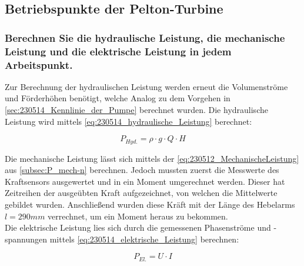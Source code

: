 \subsection{Betriebspunkte der Pelton-Turbine}
\subsubsection{Berechnen Sie die hydraulische Leistung, die mechanische Leistung und die elektrische Leistung in jedem Arbeitspunkt.}
Zur Berechnung der hydraulischen Leistung werden erneut die Volumenströme und Förderhöhen benötigt, welche Analog zu dem Vorgehen in \autoref{sec:230514_Kennlinie_der_Pumpe} berechnet wurden.
Die hydraulische Leistung wird mittels \autoref{eq:230514_hydraulische_Leistung} berechnet:

\begin{equation}
  P_{Hyd.} = \rho \cdot g \cdot Q \cdot H
  \label{eq:230514_hydraulische_Leistung}
\end{equation}

Die mechanische Leistung lässt sich mittels der \autoref{eq:230512_MechanischeLeistung} aus \autoref{subsec:P_mech-n} berechnen.
Jedoch mussten zuerst die Messwerte des Kraftsensors ausgewertet und in ein Moment umgerechnet werden.
Dieser hat Zeitreihen der ausgeübten Kraft aufgezeichnet, von welchen die Mittelwerte gebildet wurden.
Anschließend wurden diese Kräft mit der Länge des Hebelarms $l = 290 mm$ verrechnet, um ein Moment heraus zu bekommen.\\
Die elektrische Leistung lies sich durch die gemessenen Phasenströme und -spannungen mittels \autoref{eq:230514_elektrische_Leistung} berechnen:

\begin{equation}
  P_{El.} = U \cdot I
  \label{eq:230514_elektrische_Leistung}
\end{equation}

